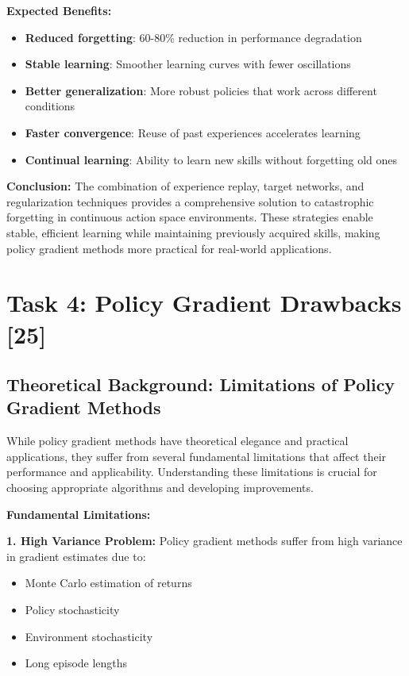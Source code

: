 \documentclass[12pt]{article}
\begin{document}
{{{\textbf{Expected Benefits:}
\begin{itemize}
    \item \textbf{Reduced forgetting}: 60-80\% reduction in performance degradation
    \item \textbf{Stable learning}: Smoother learning curves with fewer oscillations
    \item \textbf{Better generalization}: More robust policies that work across different conditions
    \item \textbf{Faster convergence}: Reuse of past experiences accelerates learning
    \item \textbf{Continual learning}: Ability to learn new skills without forgetting old ones
\end{itemize}

\textbf{Conclusion:}
The combination of experience replay, target networks, and regularization techniques provides a comprehensive solution to catastrophic forgetting in continuous action space environments. These strategies enable stable, efficient learning while maintaining previously acquired skills, making policy gradient methods more practical for real-world applications.

\newpage

\section{Task 4: Policy Gradient Drawbacks [25]}

\subsection{Theoretical Background: Limitations of Policy Gradient Methods}

While policy gradient methods have theoretical elegance and practical applications, they suffer from several fundamental limitations that affect their performance and applicability. Understanding these limitations is crucial for choosing appropriate algorithms and developing improvements.

\textbf{Fundamental Limitations:}

\textbf{1. High Variance Problem:}
Policy gradient methods suffer from high variance in gradient estimates due to:
\begin{itemize}
    \item Monte Carlo estimation of returns
    \item Policy stochasticity
    \item Environment stochasticity
    \item Long episode lengths
\end{itemize}

}}}
\end{document}
